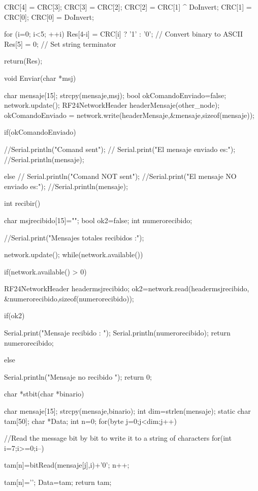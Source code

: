 \documentclass[journal,trans]{IEEEtran}
\begin{document}
\begin{itemize}
{{      CRC[4] = CRC[3];
      CRC[3] = CRC[2];
      CRC[2] = CRC[1] ^ DoInvert;
      CRC[1] = CRC[0];
      CRC[0] = DoInvert;
      }
      
   for (i=0; i<5; ++i)  Res[4-i] = CRC[i] ? '1' : '0'; // Convert binary to ASCII
   Res[5] = 0;                                         // Set string terminator

   return(Res);
   }

    void Enviar(char *msj){
    char mensaje[15];
    strcpy(mensaje,msj);
 bool okComandoEnviado=false;
  network.update();
  RF24NetworkHeader headerMensaje(other_node);
   okComandoEnviado = network.write(headerMensaje,&mensaje,sizeof(mensaje));

  if(okComandoEnviado){

    //Serial.println("Comand sent");
   // Serial.print("El mensaje enviado es:");
    //Serial.println(mensaje);
    }else{
     // Serial.println("Comand NOT sent");
         //Serial.print("El mensaje NO enviado es:");
    //Serial.println(mensaje);
      }

  
  }

  int recibir(){

  
    char msjrecibido[15]="";
  bool ok2=false;
  int numerorecibido;  

    //Serial.print("Mensajes totales recibidos :");

 network.update();
 while(network.available()){
  if(network.available() > 0){
    RF24NetworkHeader headermsjrecibido;
    ok2=network.read(headermsjrecibido,
    &numerorecibido,sizeof(numerorecibido));

    }
  }
   
if(ok2){

  Serial.print("Mensaje recibido : ");
Serial.println(numerorecibido);
return numerorecibido;
    
  }else{

    Serial.println("Mensaje no recibido ");
    return 0;
    }


  
  }

  char *stbit(char *binario){
        char mensaje[15];
    strcpy(mensaje,binario);
    int dim=strlen(mensaje); 
     static char tam[50];
     char *Data;
     int n=0;
     for(byte j=0;j<dim;j++){                //Read the message bit by bit to write it to a string of characters
    for(int i=7;i>=0;i--){
      tam[n]=bitRead(mensaje[j],i)+'0';  
      n++;
     
        }
      }
      tam[n]='\0';
     Data=tam;  
    return tam;
    }


\end{itemize}
\end{document}
